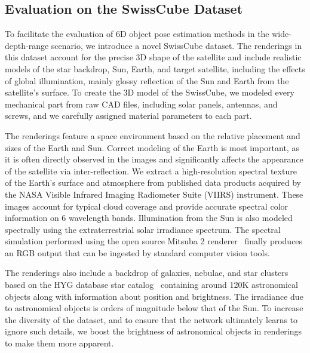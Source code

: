 
% 


\subsection{Evaluation on the SwissCube Dataset}
To facilitate the evaluation of 6D object pose estimation methods in the wide-depth-range scenario, we
introduce a novel SwissCube dataset. The renderings in this dataset account for the
precise 3D shape of the satellite and include realistic models of the star backdrop, Sun, Earth,
and target satellite, including the effects of global illumination, mainly
glossy reflection of the Sun and Earth from the satellite's surface.
To create the 3D model of the SwissCube, we modeled every mechanical part from
raw CAD files, including solar panels, antennas, and screws, and we
carefully assigned material parameters to each part.

The renderings feature a space environment based on the relative placement and
sizes of the Earth and Sun. Correct modeling of the Earth is most important, as
it is often directly observed in the images and significantly affects the
appearance of the satellite via inter-reflection. We extract a high-resolution
spectral texture of the Earth's surface and atmosphere from published data
products acquired by the NASA Visible Infrared Imaging Radiometer Suite (VIIRS)
instrument. These images account for typical cloud coverage and provide
accurate spectral color information on 6 wavelength bands. Illumination from
the Sun is also modeled spectrally using the extraterrestrial solar irradiance
spectrum. The spectral simulation performed using the open source Mitsuba 2
renderer~\cite{Nimier19} finally produces an RGB output that
can be ingested by standard computer vision tools.



The renderings also include a backdrop of galaxies, nebulae, and star clusters
based on the HYG database star catalog~\cite{hygdatabase} containing around
120K astronomical objects along with information about position and
brightness. The irradiance due to astronomical objects is orders of magnitude
below that of the Sun. To increase the diversity of the dataset, and to ensure
that the network ultimately learns to ignore such details, we boost the
brightness of astronomical objects in renderings to make them more apparent.

